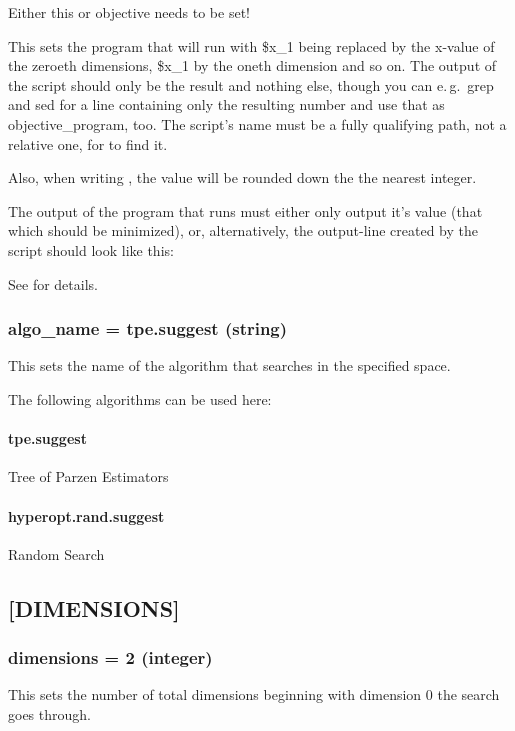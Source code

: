 \documentclass[]{scrartcl}
\begin{document}
Either this or objective needs to be set!

This sets the program that will run with \$x\_1 being replaced by the x-value of
the zeroeth dimensions, \$x\_1 by the oneth dimension and so on. The output
of the script should only be the result and nothing else, though you can
e.\,g.\ grep and sed for a line containing only the resulting number and use that
as objective\_program, too. The script's name must be a fully qualifying path,
not a relative one, for  to find it.

Also, when writing , the value will be rounded down the the
nearest integer.

The output of the program that runs must either only output it's value (that which
should be minimized), or, alternatively, the output-line created by the script
should look like this:


See  for details.

\subsubsection{algo\_name = tpe.suggest (string)}

This sets the name of the algorithm that searches in the specified space.

The following algorithms can be used here:

    \paragraph{tpe.suggest}
        Tree of Parzen Estimators

    \paragraph{hyperopt.rand.suggest}
        Random Search

\subsection{[DIMENSIONS]}

\subsubsection{dimensions = 2 (integer)}

This sets the number of total dimensions beginning with dimension 0 the search goes through.
\end{document}
